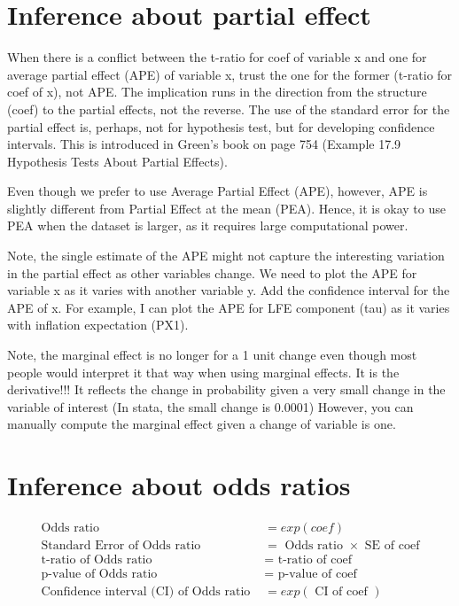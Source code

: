 \documentclass[10pt]{article}
\title{}
\author{}
\date{}
\begin{document}
\maketitle


\section{Inference about partial effect}
When there is a conflict between the t-ratio for coef of variable x
and one for average partial effect (APE) of variable x, trust the
one for the former (t-ratio for coef of x), not APE.
The implication runs in the direction from the structure (coef) to
the partial effects, not the reverse.
The use of the standard error for the partial effect is, perhaps,
not for hypothesis test, but for developing confidence intervals.
This is introduced in Green's book on page 754 (Example 17.9 
Hypothesis Tests About Partial Effects).

Even though we prefer to use Average Partial Effect (APE), however, 
APE is slightly different from Partial Effect at the mean (PEA).
Hence, it is okay to use PEA when the dataset is larger, as it
requires large computational power.

Note, the single estimate of the APE might not capture the 
interesting variation in the partial effect as other variables
change. We need to plot the APE for variable x as it varies
with another variable y. Add the confidence interval for 
the APE of x. For example, I can plot the APE for LFE component 
(tau) as it varies with inflation expectation (PX1).



Note, the marginal effect is no longer for a 1 unit change even though most people would
interpret it that way when using marginal effects. It is the derivative!!! It reflects
the change in probability given a very small change in the variable of interest (In stata, the
small change is 0.0001)
However, you can manually compute the marginal effect given a change of variable is one.

\section{Inference about odds ratios }

\begin{align*}
\text{ Odds ratio } &= exp(coef)\\
\text{ Standard Error of Odds ratio } &= \text{ Odds ratio }  \times \text{ SE of coef }\\
\text{ t-ratio of Odds ratio } &= \text{ t-ratio of coef }\\
\text{ p-value of Odds ratio } &= \text{ p-value of coef }\\
\text{ Confidence interval (CI) of Odds ratio } &= exp(\text{ CI of coef })
\end{align*}
\end{document}
